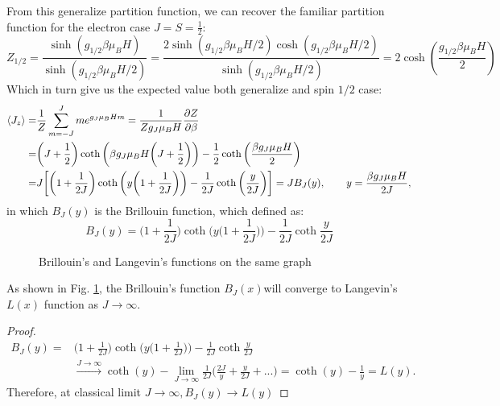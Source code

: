\documentclass[a4paper]{article}
\begin{document}
\quad From this generalize partition function, we can recover the familiar partition function for the electron case \(J = S = \frac{1}{2}\):
\begin{equation}
	Z_{1/2} = \frac{\sinh ( g_{1/2}\beta  \mu_B H)}{\sinh ( g_{1/2}\beta \mu_B H/2)} = \frac{2\sinh ( g_{1/2}\beta \mu_B H/2) \cosh ( g_{1/2}\beta \mu_B H/2)}{\sinh ( g_{1/2}\beta \mu_B H/2)} = 2 \cosh ( \frac{g_{1/2}\beta \mu_B H}{2})
\end{equation}
Which in turn give us the expected value both generalize and spin \(1/2\) case:
\begin{align}
\ev{J_z} =& \frac{1}{Z}\sum_{m = -J}^{J} m e^{g_J \mu_B H m} = \frac{1}{Z g_{J}\mu_B H} \pdv{Z}{\beta}\nonumber\\ 
=& \bigg(J + \frac{1}{2}\bigg) \coth \bigg(\beta g_J \mu_B H \bigg(J + \frac{1}{2}\bigg)\bigg) - \frac{1}{2}\coth \bigg(\frac{\beta g_J \mu_B H}{2}\bigg)\nonumber \\
=& J \bigg[\bigg(1 + \frac{1}{2J}\bigg) \coth \bigg(y \bigg(1 + \frac{1}{2J}\bigg)\bigg) - \frac{1}{2J}\coth \bigg(\frac{y}{2J}\bigg)\bigg] = J B_{J}(y), \qquad y = \frac{\beta g_J \mu_B H}{2J},
\end{align}
in which \(B_J(y)\) is the Brillouin function, which defined as:
\begin{equation}
	B_J(y) = \bigg(1 + \frac{1}{2J}\bigg) \coth\bigg(y\bigg(1 + \frac{1}{2J}\bigg)\bigg) - \frac{1}{2J} \coth \frac{y}{2J}
\end{equation}
\begin{figure}[!ht]
\begin{center}
\caption{Brillouin's and Langevin's functions on the same graph}
\label{Fig: L and B}
\end{center}
\end{figure}
\quad As shown in Fig. \ref{Fig: L and B}, the Brillouin's function \(B_J (x)\)will converge to Langevin's \(L(x)\) function as \(J \to \infty\).
\begin{proof}
	\begin{align*}
		B_J(y) =& \bigg(1 + \frac{1}{2J}\bigg) \coth\bigg(y\bigg(1 + \frac{1}{2J}\bigg)\bigg) - \frac{1}{2J} \coth \frac{y}{2J}\\
		&\xrightarrow{J \to \infty} \coth (y) - \lim_{J\to \infty}\frac{1}{2J} \bigg(\frac{2J}{y} + \frac{y}{2J} + ...\bigg) = \coth (y) - \frac{1}{y} = L(y).\end{align*}
Therefore, at classical limit \(J \to \infty, B_{J}(y) \to L(y)\)
\end{proof}
\end{document}
